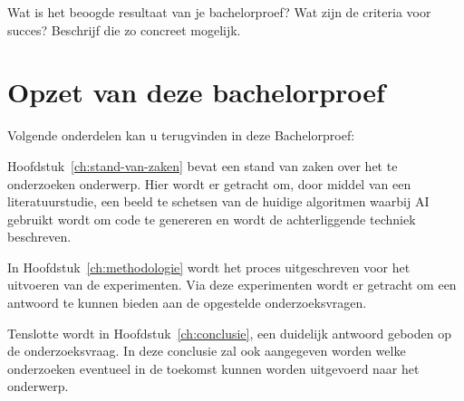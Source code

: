 Wat is het beoogde resultaat van je bachelorproef? Wat zijn de criteria voor succes? Beschrijf die zo concreet mogelijk.

\section{Opzet van deze bachelorproef}
\label{sec:opzet-bachelorproef}

Volgende onderdelen kan u terugvinden in deze Bachelorproef:

Hoofdstuk~\ref{ch:stand-van-zaken} bevat een stand van zaken over het te onderzoeken onderwerp. Hier wordt er getracht om, door middel van een literatuurstudie, een beeld te schetsen van de huidige algoritmen waarbij AI gebruikt wordt om code te genereren en wordt de achterliggende techniek beschreven.

In Hoofdstuk~\ref{ch:methodologie} wordt het proces uitgeschreven voor het uitvoeren van de experimenten. Via deze experimenten wordt er getracht om een antwoord te kunnen bieden aan de opgestelde onderzoeksvragen.

Tenslotte wordt in Hoofdstuk~\ref{ch:conclusie}, een duidelijk antwoord geboden op de onderzoeksvraag. In deze conclusie zal ook aangegeven worden welke onderzoeken eventueel in de toekomst kunnen worden uitgevoerd naar het onderwerp.